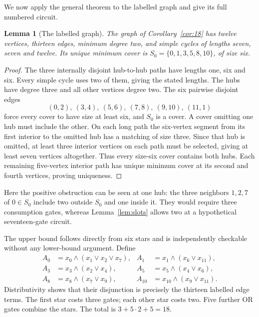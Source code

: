 \documentclass[11pt]{article}
\newcommand{\AND}{\mathbin{\wedge}}
\newcommand{\OR}{\mathbin{\vee}}
\newtheorem{lemma}[theorem]{Lemma}
\theoremstyle{definition}
\theoremstyle{remark}
\begin{document}
We now apply the general theorem to the labelled graph and give its full
numbered circuit.

\begin{lemma}[The labelled graph]\label{lem:parameters}
The graph of Corollary~\ref{cor:18} has twelve vertices, thirteen edges,
minimum degree two, and simple cycles of lengths seven, seven and twelve.
Its unique minimum cover is $S_0=\{0,1,3,5,8,10\}$, of size six.
\end{lemma}
\begin{proof}
The three internally disjoint hub-to-hub paths have lengths one, six and
six. Every simple cycle uses two of them, giving the stated lengths.
The hubs have degree three and all other vertices degree two.
The six pairwise disjoint edges
\[
 (0,2),\ (3,4),\ (5,6),\ (7,8),\ (9,10),\ (11,1)
\]
force every cover to have size at least six, and $S_0$ is a cover.
A cover omitting one hub must include the other. On each long path the
six-vertex segment from its first interior to the omitted hub has a
matching of size three. Since that hub is omitted, at least three interior
vertices on each path must be selected, giving at least seven vertices
altogether. Thus every size-six cover contains both hubs. Each remaining
five-vertex interior path has unique minimum cover at its second and fourth
vertices, proving uniqueness.
\end{proof}

Here the positive obstruction can be seen at one hub: the three neighbors
$1,2,7$ of $0\in S_0$ include two outside $S_0$ and one inside it. They
would require three consumption gates, whereas Lemma~\ref{lem:slots}
allows two at a hypothetical seventeen-gate circuit.

The upper bound follows directly from six stars and is independently
checkable without any lower-bound argument. Define
\begin{align*}
A_0&=x_0\AND(x_1\OR x_2\OR x_7),&
A_1&=x_1\AND(x_6\OR x_{11}),\\
A_3&=x_3\AND(x_2\OR x_4),&
A_5&=x_5\AND(x_4\OR x_6),\\
A_8&=x_8\AND(x_7\OR x_9),&
A_{10}&=x_{10}\AND(x_9\OR x_{11}).
\end{align*}
Distributivity shows that their disjunction is precisely the thirteen
labelled edge terms. The first star costs three gates; each other star
costs two. Five further OR gates combine the stars. The total is
$3+5\cdot2+5=18$.
\end{document}
